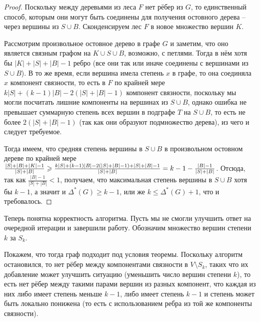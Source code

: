 \documentclass[a4paper,11pt]{article}
\renewcommand{\le}{\ensuremath{\leqslant}}
\renewcommand{\ge}{\ensuremath{\geqslant}}
\theoremstyle{plain}
\theoremstyle{definition}
\theoremstyle{remark}
\begin{document}
\begin{proof}

Поскольку между деревьями из леса $F$ нет рёбер из $G$, то единственный способ, которым они могут быть соединены для получения остовного дерева -- через вершины из $S \cup B$. Сконденсируем лес $F$ в новое множество вершин $K$.

Рассмотрим произвольное остовное дерево в графе $G$ и заметим, что оно является связным графом на $K \cup S \cup B$, возможно, с петлями. Тогда в нём хотя бы $|K| + |S| + |B| - 1$ ребро (все они так или иначе соединены с вершинами из $S \cup B$). В то же время, если вершина имела степень $x$ в графе, то она соединяла $x$ компонент связности, то есть в $F$ по крайней мере $k |S| + (k-1) |B| - 2(|S| + |B| - 1)$ компонент связности, поскольку мы могли посчитать лишние компоненты на вершинах из $S \cup B$, однако ошибка не превышает суммарную степень всех вершин в подграфе $T$ на $S \cup B$, то есть не более $2(|S| + |B| - 1)$ (так как они образуют подмножество дерева), из чего и следует требуемое.

Тогда имеем, что средняя степень вершины в $S \cup B$ в произвольном остовном дереве по крайней мере $\frac{|S| + |B| + |K| - 1}{|S| + |B|} \ge \newline
\frac{k |S| + (k - 1) |B|  - 2 (|S| + |B| - 1) + |S| + |B| - 1}{|S| + |B|} = k - 1 - \frac{|B| - 1}{|S| + |B|}$. Отсюда, так как $\frac{|B| - 1}{|S| + |B|} < 1$, получаем, что максимальная степень вершины в $S \cup B$ хотя бы $k - 1$, а значит и $\Delta^*(G) \ge k - 1$, или же $k \le \Delta^*(G) + 1$, что и требовалось.

\end{proof}

Теперь понятна корректность алгоритма. Пусть мы не смогли улучшить ответ на очередной итерации и завершили работу. Обозначим множество вершин степени $k$ за $S_k$.

Покажем, что тогда граф подходит под условия теоремы. Поскольку алгоритм остановился, то нет рёбер между компонентами связности в $V \setminus S_k$, таких что их добавление может улучшить ситуацию (уменьшить число вершин степени $k$), то есть нет рёбер между такими парами вершин из разных компонент, что каждая из них либо имеет степень меньше $k-1$, либо имеет степень $k-1$ и степень может быть локально понижена (то есть с использованием ребра из той же компоненты связности).
\end{document}
